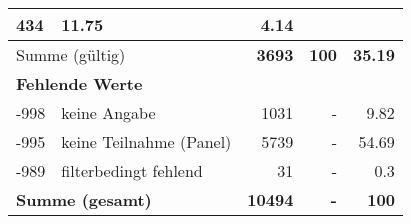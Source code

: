 \begin{longtable}{lXrrr}
       \num{434} &
       \num[round-mode=places,round-precision=2]{11.75} &
         \num[round-mode=places,round-precision=2]{4.14} \\
     \midrule
     \multicolumn{2}{l}{Summe (gültig)} &
       \textbf{\num{3693}} &
     \textbf{\num{100}} &
       \textbf{\num[round-mode=places,round-precision=2]{35.19}} \\
     \multicolumn{5}{l}{\textbf{Fehlende Werte}}\\
       -998 &
       keine Angabe &
         \num{1031} &
        - &
         \num[round-mode=places,round-precision=2]{9.82} \\
       -995 &
       keine Teilnahme (Panel) &
         \num{5739} &
        - &
         \num[round-mode=places,round-precision=2]{54.69} \\
       -989 &
       filterbedingt fehlend &
         \num{31} &
        - &
         \num[round-mode=places,round-precision=2]{0.3} \\
     \midrule
     \multicolumn{2}{l}{\textbf{Summe (gesamt)}} &
          \textbf{\num{10494}} &
        \textbf{-} &
        \textbf{\num{100}} \\
     \bottomrule
     \end{longtable}
     
